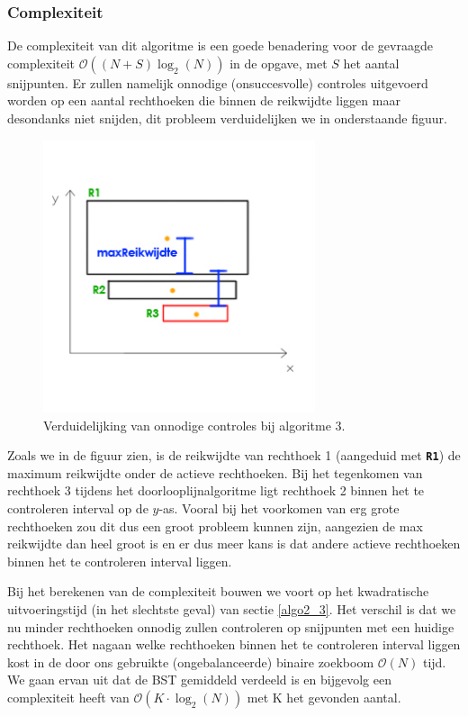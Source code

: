 \documentclass{article}
\begin{document}
\subsubsection{Complexiteit}
\label{algo3_3}
De complexiteit van dit algoritme is een goede benadering voor de gevraagde complexiteit $\mathcal{O}((N+S)\log_2(N))$ in de opgave, met $S$ het aantal snijpunten. Er zullen namelijk onnodige (onsuccesvolle) controles uitgevoerd worden op een aantal rechthoeken die binnen de reikwijdte liggen maar desondanks niet snijden, dit probleem verduidelijken we in onderstaande figuur.

\begin{figure}[H]
\centering
\includegraphics[width=8cm,height=8cm,keepaspectratio]{algo3_problem}
\caption{Verduidelijking van onnodige controles bij algoritme 3.}\label{algo3_problem}
\end{figure}

Zoals we in de figuur zien, is de reikwijdte van rechthoek 1 (aangeduid met \texttt{\textbf{{\color{green}R1}}}) de maximum reikwijdte onder de actieve rechthoeken. Bij het tegenkomen van rechthoek 3 tijdens het doorlooplijnalgoritme ligt rechthoek 2 binnen het te controleren interval op de $y$-as. Vooral bij het voorkomen van erg grote rechthoeken zou dit dus een groot probleem kunnen zijn, aangezien de max reikwijdte dan heel groot is en er dus meer kans is dat andere actieve rechthoeken binnen het te controleren interval liggen.

Bij het berekenen van de complexiteit bouwen we voort op het kwadratische uitvoeringstijd (in het slechtste geval) van sectie \ref{algo2_3}. Het verschil is dat we nu minder rechthoeken onnodig zullen controleren op snijpunten met een huidige rechthoek. Het nagaan welke rechthoeken binnen het te controleren interval liggen kost in de door ons gebruikte (ongebalanceerde) binaire zoekboom $\mathcal{O}(N)$ tijd. We gaan ervan uit dat de BST gemiddeld verdeeld is en bijgevolg een complexiteit heeft van $\mathcal{O}(K\cdot\log_2(N))$ met K het gevonden aantal. 
\end{document}
